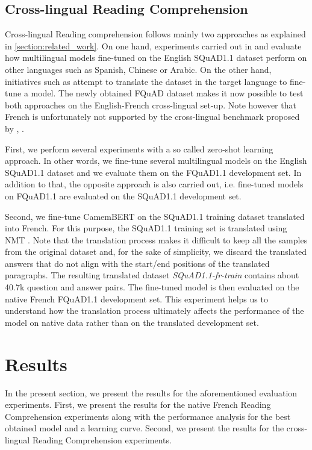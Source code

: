 \documentclass{article}
\begin{document}
\subsection{Cross-lingual Reading Comprehension}

Cross-lingual Reading comprehension follows mainly two approaches as explained in \ref{section:related_work}.
On one hand, experiments carried out in \citep{mlqa} and \citep{xquad} evaluate how multilingual models fine-tuned on the English SQuAD1.1 dataset perform on other languages such as Spanish, Chinese or Arabic. 
On the other hand, initiatives such as \citep{spanishsquad} attempt to translate the dataset in the target language to fine-tune a model.
The newly obtained FQuAD dataset makes it now possible to test both approaches on the English-French cross-lingual set-up.
Note however that French is unfortunately not supported by the cross-lingual benchmark proposed by \citep*{mlqa}, \citep{xquad}.

First, we perform several experiments with a so called zero-shot learning approach.
In other words, we fine-tune several multilingual models on the English SQuAD1.1 dataset and we evaluate them on the FQuAD1.1 development set.
In addition to that, the opposite approach is also carried out, i.e. fine-tuned models on FQuAD1.1 are evaluated on the SQuAD1.1 development set.

Second, we fine-tune CamemBERT on the SQuAD1.1 training dataset translated into French.
For this purpose, the SQuAD1.1 training set is translated using NMT \citep{french-nmt}.
Note that the translation process makes it difficult to keep all the samples from the original dataset and, for the sake of simplicity, we discard the translated answers that do not align with the start/end positions of the translated paragraphs.
The resulting translated dataset \textit{SQuAD1.1-fr-train} contains about 40.7k question and answer pairs.
The fine-tuned model is then evaluated on the native French FQuAD1.1 development set.
This experiment helps us to understand how the translation process ultimately affects the performance of the model on native data rather than on the translated development set.








 
\section{Results}
\label{section:results}
In the present section, we present the results for the aforementioned evaluation experiments.
First, we present the results for the native French Reading Comprehension experiments along with the performance analysis for the best obtained model and a learning curve.
Second, we present the results for the cross-lingual Reading Comprehension experiments.
\end{document}
